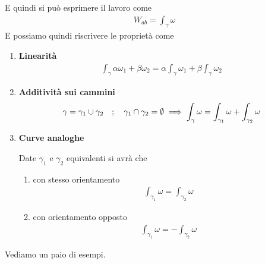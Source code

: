 E quindi si può esprimere il lavoro come
\begin{align}
	W_{ab}=\int_{\gamma} \omega
\end{align}
\newpage
E possiamo quindi riscrivere le proprietà come
\begin{enumerate}
	\item \textbf{Linearità}
	\begin{align}
		\int_\gamma \alpha \omega_1 + \beta \omega_2 =  \alpha \int_\gamma \omega_1 + \beta \int_\gamma \omega_2
	\end{align}
	\item \textbf{Additività sui cammini}
	\begin{align}
		\gamma = \gamma_1 \cup \gamma_2 \quad ; \quad \gamma_1 \cap \gamma_2 = \emptyset \implies  \int_\gamma \omega =  \int_{\gamma_1} \omega +  \int_{\gamma_2} \omega
	\end{align}
	\item \textbf{Curve analoghe}
	
	Date $\gamma_1$ e $\gamma_2$ equivalenti si avrà che 
	\begin{enumerate}
		\item con stesso orientamento 
		\begin{align}
			\int_{\gamma_1} \omega =  \int_{\gamma_2} \omega
		\end{align}
		\item con orientamento opposto
		\begin{align}
			\int_{\gamma_1} \omega =  -\int_{\gamma_2} \omega
		\end{align}
	\end{enumerate}
\end{enumerate}

Vediamo un paio di esempi.

\begin{figure}[!htb]
\end{figure}

